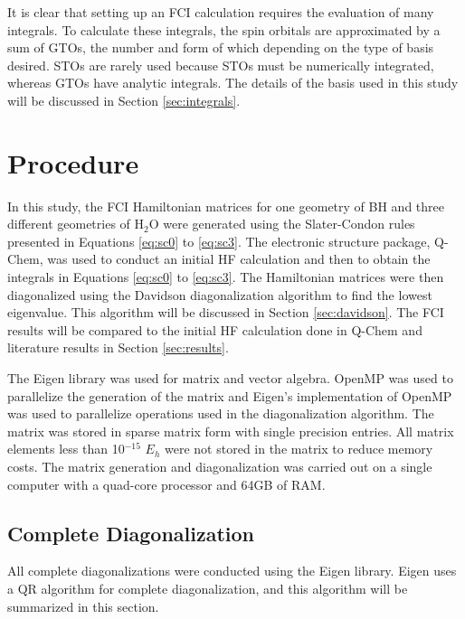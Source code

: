 \documentclass[final,3p,times,twocolumn]{elsarticle}
\begin{document}
It is clear that setting up an FCI calculation requires the evaluation of many integrals. To calculate these integrals, the spin orbitals are approximated by a sum of GTOs,\cite{gto} the number and form of which depending on the type of basis desired. STOs are rarely used because STOs must be numerically integrated, whereas GTOs have analytic integrals.\cite{szabo} The details of the basis used in this study will be discussed in Section \ref{sec:integrals}.

\section{Procedure}

In this study, the FCI Hamiltonian matrices for one geometry of BH and three different geometries of H$_2$O were generated using the Slater-Condon rules presented in Equations \eqref{eq:sc0} to \eqref{eq:sc3}. The electronic structure package, Q-Chem,\cite{qchem} was used to conduct an initial HF calculation and then to obtain the integrals in Equations \eqref{eq:sc0} to \eqref{eq:sc3}. The Hamiltonian matrices were then diagonalized using the Davidson diagonalization algorithm\cite{davidson,liu} to find the lowest eigenvalue. This algorithm will be discussed in Section \ref{sec:davidson}. The FCI results will be compared to the initial HF calculation done in Q-Chem and literature results\cite{handy-1983} in Section \ref{sec:results}.

The Eigen library was used for matrix and vector algebra.\cite{eigen} OpenMP was used to parallelize the generation of the matrix and Eigen's implementation of OpenMP was used to parallelize operations used in the diagonalization algorithm.\cite{openmp} The matrix was stored in sparse matrix form with single precision entries. All matrix elements less than 10$^{-15}$ $E_h$ were not stored in the matrix to reduce memory costs. %
The matrix generation and diagonalization was carried out on a single computer with a quad-core processor and 64GB of RAM.


\subsection{Complete Diagonalization} \label{sec:qr}
All complete diagonalizations were conducted using the Eigen library.\cite{eigen} Eigen uses a QR algorithm\cite{qr} for complete diagonalization, and this algorithm will be summarized in this section.
\end{document}
